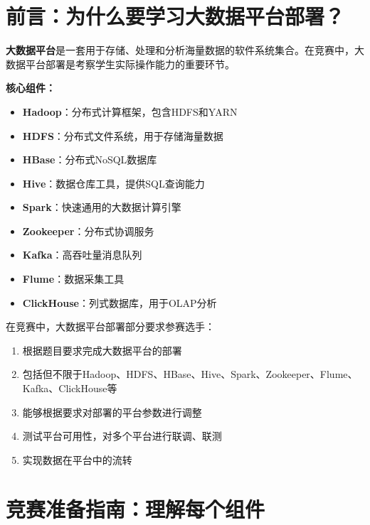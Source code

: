 \documentclass[12pt,a4paper]{article}
\begin{document}
\tableofcontents
\newpage

\section{前言：为什么要学习大数据平台部署？}

\begin{theorybox}[什么是大数据平台？]
\textbf{大数据平台}是一套用于存储、处理和分析海量数据的软件系统集合。在竞赛中，大数据平台部署是考察学生实际操作能力的重要环节。

\textbf{核心组件：}
\begin{itemize}
    \item \textbf{Hadoop}：分布式计算框架，包含HDFS和YARN
    \item \textbf{HDFS}：分布式文件系统，用于存储海量数据
    \item \textbf{HBase}：分布式NoSQL数据库
    \item \textbf{Hive}：数据仓库工具，提供SQL查询能力
    \item \textbf{Spark}：快速通用的大数据计算引擎
    \item \textbf{Zookeeper}：分布式协调服务
    \item \textbf{Kafka}：高吞吐量消息队列
    \item \textbf{Flume}：数据采集工具
    \item \textbf{ClickHouse}：列式数据库，用于OLAP分析
\end{itemize}
\end{theorybox}

\begin{knowledgebox}[竞赛中的大数据平台部署]
在竞赛中，大数据平台部署部分要求参赛选手：
\begin{enumerate}
    \item 根据题目要求完成大数据平台的部署
    \item 包括但不限于Hadoop、HDFS、HBase、Hive、Spark、Zookeeper、Flume、Kafka、ClickHouse等
    \item 能够根据要求对部署的平台参数进行调整
    \item 测试平台可用性，对多个平台进行联调、联测
    \item 实现数据在平台中的流转
\end{enumerate}
\end{knowledgebox}

\section{竞赛准备指南：理解每个组件}
\end{document}
